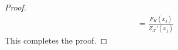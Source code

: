 \begin{proof}
\begin{align*}
		& = \frac{F_K(x_j)}{Z_\mathcal{X}'(x_j)}
	\end{align*}
	This completes the proof.
%
%
\end{proof}

